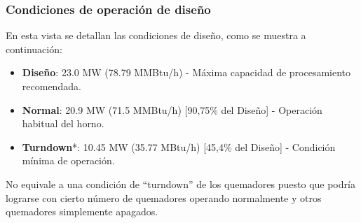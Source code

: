 \subsubsection{Condiciones de operación de diseño}
\par En esta vista se detallan las condiciones de diseño, como se muestra a continuación:
\begin{itemize}
    \item \textbf{Diseño}: 23.0 MW (78.79 MMBtu/h) - Máxima capacidad de procesamiento recomendada.
    \item \textbf{Normal}: 20.9 MW (71.5 MMBtu/h) [90,75\% del Diseño] - Operación habitual del horno.
    \item \textbf{Turndown}*: 10.45 MW (35.77 MBtu/h) [45,4\% del Diseño] - Condición mínima de operación.
\end{itemize}
\par *No equivale a una condición de ``turndown'' de los quemadores puesto que podría lograrse con cierto número de quemadores operando normalmente y otros quemadores simplemente apagados.

